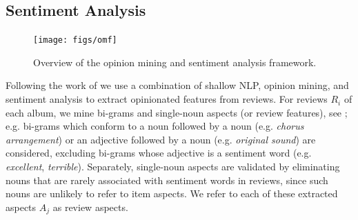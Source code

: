 


\subsection{Sentiment Analysis}\label{sec:sentiment}
\begin{figure}
\texttt{[image: figs/omf]}
\caption{Overview of the opinion mining and sentiment analysis framework.}
\label{fig:OMF}
\end{figure}
Following the work of \cite{DongSOS13,DongOS14} we use a combination of shallow NLP, opinion mining, and sentiment analysis to extract opinionated features from reviews. For reviews $R_{i}$ of each album, we mine bi-grams and single-noun aspects (or review features), see \cite{Hu2004}; e.g. bi-grams which conform to a noun followed by a noun (e.g. \emph{chorus arrangement}) or an adjective followed by a noun (e.g. \emph{original sound}) are considered, excluding bi-grams whose adjective is a sentiment word (e.g. \emph{excellent}, \emph{terrible}). Separately, single-noun aspects are validated by eliminating nouns that are rarely associated with sentiment words in reviews, since such nouns are unlikely to refer to item aspects. We refer to each of these extracted aspects $A_{j}$ as review aspects.

